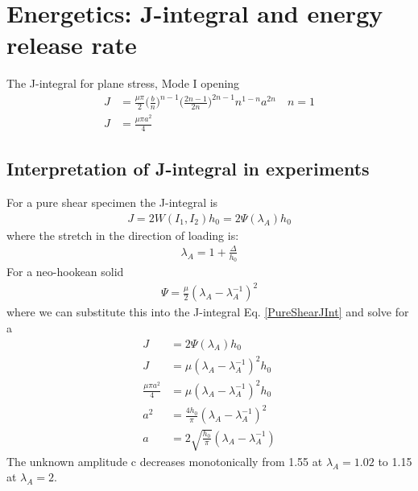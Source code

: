 \documentclass[12pt,3p]{article}
\numberwithin{equation}{section}
\begin{document}
\section{Energetics: J-integral and energy release rate}
The J-integral for plane stress, Mode I opening 
\begin{align*}
J &= \frac{\mu \pi}{2} \bigg( \frac{b}{n} \bigg)^{n-1} \bigg( \frac{2n - 1}{2n} \bigg)^{2n - 1} n^{1-n} a^{2n} \quad n = 1 \\
J &= \frac{\mu \pi a^{2}}{4}
\end{align*}

\subsection{Interpretation of J-integral in experiments}
For a pure shear specimen the J-integral is
\begin{align}\label{PureShearJInt}
J = 2 W (I_1, I_2) h_0 = 2 \Psi (\lambda_A) h_0
\end{align}
where the stretch in the direction of loading is: 
\begin{align*}
\lambda_A = 1 + \frac{\Delta}{h_0}
\end{align*}
For a neo-hookean solid 
\begin{align*}
\Psi = \frac{\mu}{2} (\lambda_A - \lambda_A^{-1})^2
\end{align*}
where we can substitute this into the J-integral Eq. \ref{PureShearJInt} and solve for a 
\begin{align*}
J &= 2 \Psi (\lambda_A) h_0 \\
J &= \mu (\lambda_A - \lambda_A^{-1})^2 h_0 \\
\frac{\mu \pi a^{2}}{4} &= \mu (\lambda_A - \lambda_A^{-1})^2 h_0 \\
a^{2} &= \frac{4h_0}{\pi} (\lambda_A - \lambda_A^{-1})^2 \\
a &= 2 \sqrt{\frac{h_0}{\pi}} (\lambda_A - \lambda_A^{-1})
\end{align*}
The unknown amplitude c decreases monotonically from 1.55 at $\lambda_A = 1.02$ to 1.15 at $\lambda_A = 2$. 
\end{document}
